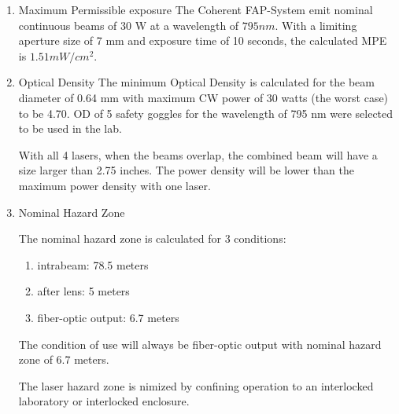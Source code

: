 \begin {enumerate}
\item {Maximum Permissible exposure}
The Coherent FAP-System
 emit nominal 
continuous beams of 30 W at a wavelength of $795 nm$.
With a limiting aperture size of 7 mm and exposure time of 10 seconds,
the calculated MPE is $1.51 mW/cm^2$.

\item {Optical Density}
The minimum Optical Density is calculated for the beam diameter of 0.64 mm
with maximum CW power of 30 watts (the worst case) to be 4.70. 
OD of 5 safety goggles for the wavelength of 795 nm were selected to be used in the lab.

With all 4 lasers, when the beams overlap, the 
combined beam will have a size larger than 2.75 inches. The power density will be lower than the maximum power density with one laser. 

\item {Nominal Hazard Zone}

The nominal hazard zone is calculated for 3 conditions:
\begin{enumerate}
\item {} intrabeam: 78.5 meters
\item {} after lens: 5 meters
\item {} fiber-optic output: 6.7 meters
\end{enumerate}
The condition of use will always be fiber-optic output with nominal hazard
zone of 6.7 meters.

The laser hazard zone is nimized by confining operation to an interlocked 
laboratory or interlocked enclosure.
\end{enumerate}


